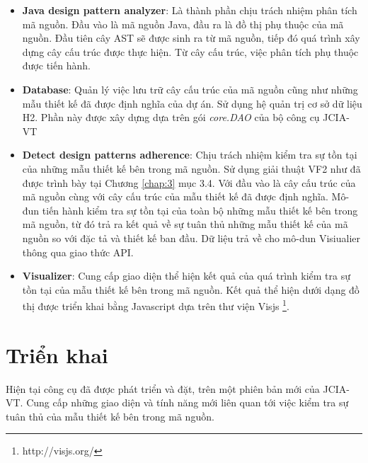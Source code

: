 \documentclass[12pt]{report}
\begin{document}
\begin{itemize}
	\item \noindent \textbf{Java design pattern analyzer}: Là thành phần chịu trách nhiệm phân tích mã nguồn. Đầu vào là mã nguồn Java, đầu ra là đồ thị phụ thuộc của mã nguồn. Đầu tiên cây AST sẽ được sinh ra từ mã nguồn, tiếp đó quá trình xây dựng cây cấu trúc được thực hiện. Từ cây cấu trúc, việc phân tích phụ thuộc được tiến hành.
	\item \noindent \textbf{Database}: Quản lý việc lưu trữ cây cấu trúc của mã nguồn cũng như những mẫu thiết kế đã được định nghĩa của dự án. Sử dụng hệ quản trị cơ sở dữ liệu H2. Phần này được xây dựng dựa trên gói \textit{core.DAO} của bộ công cụ JCIA-VT
	\item \noindent \textbf{Detect design patterns adherence}: Chịu trách nhiệm kiểm tra sự tồn tại của những mẫu thiết kế bên trong mã nguồn. Sử dụng giải thuật VF2 như đã được trình bày tại Chương \ref{chap:3} mục 3.4. Với đầu vào là cây cấu trúc của mã nguồn cùng với cây cấu trúc của mẫu thiết kế đã được định nghĩa. Mô-đun tiến hành kiểm tra sự tồn tại của toàn bộ những mẫu thiết kế bên trong mã nguồn, từ đó trả ra kết quả về sự tuân thủ những mẫu thiết kế của mã nguồn so với đặc tả và thiết kế ban đầu. Dữ liệu trả về cho mô-dun Visiualier thông qua giao thức API.
	\item \noindent \textbf{Visualizer}: Cung cấp giao diện thể hiện kết quả của quá trình kiểm tra sự tồn tại của mẫu thiết kế bên trong mã nguồn. Kết quả thể hiện dưới dạng đồ thị được triển khai bằng Javascript dựa trên thư viện Visjs \footnote{http://visjs.org/}.  
\end{itemize}
\section{Triển khai}
Hiện tại công cụ đã được phát triển và đặt, trên một phiên bản mới của JCIA-VT. Cung cấp những giao diện và tính năng mới liên quan tới việc kiểm tra sự tuân thủ của mẫu thiết kế bên trong mã nguồn.
\end{document}
